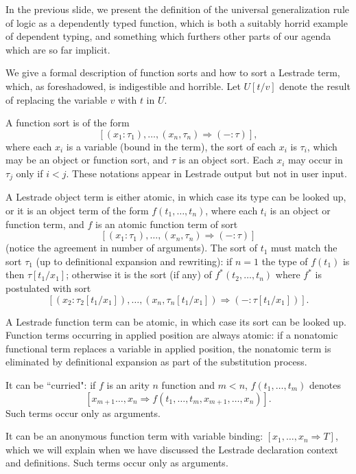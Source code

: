 \documentclass[12pt]{slides}
\begin{document}
\begin{slide}

In the previous slide, we present the definition of the universal generalization rule of logic as a dependently typed function, which is both a suitably horrid example of dependent typing, and something which furthers other parts of our agenda which are so far implicit.


\end{slide}

\begin{slide}

We give a formal description of function sorts and how to sort a Lestrade term, which, as foreshadowed, is indigestible and horrible.  Let $U[t/v]$ denote the result of replacing the variable $v$ with $t$ in $U$.

A function sort is of the form $$[(x_1:\tau_1),\ldots,(x_n,\tau_n)\Rightarrow (-:\tau)],$$ where each $x_i$ is a variable
(bound in the term), the sort of each $x_i$ is $\tau_i$, which may be an object or function sort, and $\tau$ is an object sort.
Each $x_i$ may occur in $\tau_j$ only if $i<j$.  These notations appear in Lestrade output but not in user input.

A Lestrade object term is either atomic, in which case its type can be looked up, or it is an object term of the form
$f(t_1,\ldots,t_n)$, where each $t_i$ is an object or function term, and $f$ is an atomic function term of sort
$$[(x_1:\tau_1),\ldots,(x_n,\tau_n)\Rightarrow (-:\tau)]$$ (notice the agreement in number of arguments).  The sort of
$t_1$ must match the sort $\tau_1$ (up to definitional expansion and rewriting):  if $n=1$ the type of $f(t_1)$ is then
$\tau[t_1/x_1]$; otherwise it is the sort (if any) of $f^*(t_2,\ldots,t_n)$ where $f^*$ is postulated with sort $$[(x_2:\tau_2[t_1/x_1]),\ldots,(x_n,\tau_n[t_1/x_1])\Rightarrow (-:\tau[t_1/x_1])].$$

A Lestrade function term can be atomic, in which case its sort can be looked up.  Function terms occurring in applied position are always atomic:  if a nonatomic functional term replaces a variable in applied position, the nonatomic term is eliminated by definitional expansion as  part of the substitution process.

It can be ``curried":  if $f$ is an arity $n$ function and $m<n$, $f(t_1,\ldots,t_m)$ denotes $$[x_{m+1}\ldots,x_n\Rightarrow f(t_1,\ldots,t_m,x_{m+1},\ldots,x_n)].$$  Such terms occur only as arguments.

It can be an anonymous function term with variable binding: $[x_1,\ldots,x_n \Rightarrow T]$, which we will explain when we have discussed the Lestrade declaration context and definitions.  Such terms occur only as arguments. 

\end{slide}
\end{document}
